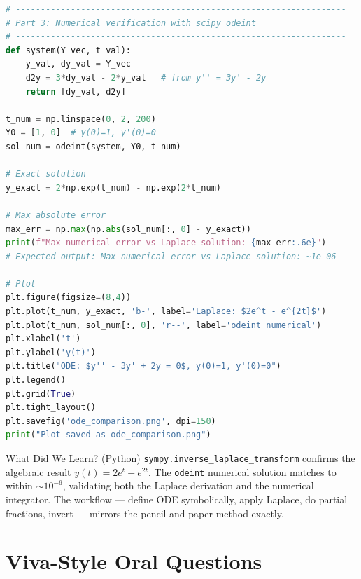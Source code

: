 \documentclass[12pt,a4paper]{article}
\begin{document}
\begin{lstlisting}[language=Python, caption={Solving IVPs with SymPy Laplace transform and dsolve, plus numerical verification}]
# ------------------------------------------------------------------
# Part 3: Numerical verification with scipy odeint
# ------------------------------------------------------------------
def system(Y_vec, t_val):
    y_val, dy_val = Y_vec
    d2y = 3*dy_val - 2*y_val   # from y'' = 3y' - 2y
    return [dy_val, d2y]

t_num = np.linspace(0, 2, 200)
Y0 = [1, 0]  # y(0)=1, y'(0)=0
sol_num = odeint(system, Y0, t_num)

# Exact solution
y_exact = 2*np.exp(t_num) - np.exp(2*t_num)

# Max absolute error
max_err = np.max(np.abs(sol_num[:, 0] - y_exact))
print(f"Max numerical error vs Laplace solution: {max_err:.6e}")
# Expected output: Max numerical error vs Laplace solution: ~1e-06

# Plot
plt.figure(figsize=(8,4))
plt.plot(t_num, y_exact, 'b-', label='Laplace: $2e^t - e^{2t}$')
plt.plot(t_num, sol_num[:, 0], 'r--', label='odeint numerical')
plt.xlabel('t')
plt.ylabel('y(t)')
plt.title("ODE: $y'' - 3y' + 2y = 0$, y(0)=1, y'(0)=0")
plt.legend()
plt.grid(True)
plt.tight_layout()
plt.savefig('ode_comparison.png', dpi=150)
print("Plot saved as ode_comparison.png")
\end{lstlisting}

\begin{learnbox}{What Did We Learn? (Python)}
\texttt{sympy.inverse\_laplace\_transform} confirms the algebraic result
$y(t) = 2e^t - e^{2t}$. The \texttt{odeint} numerical solution matches
to within $\sim 10^{-6}$, validating both the Laplace derivation and the
numerical integrator. The workflow --- define ODE symbolically, apply
Laplace, do partial fractions, invert --- mirrors the pencil-and-paper
method exactly.
\end{learnbox}

\section{Viva-Style Oral Questions}
\end{document}
